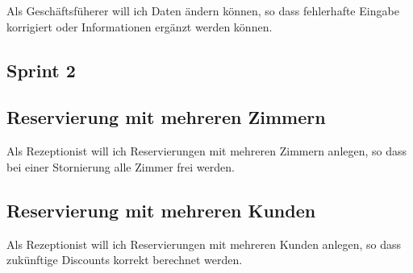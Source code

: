 \documentclass[11pt]{scrartcl}
\begin{document}
Als Geschäftsfüherer will ich Daten ändern können, so dass fehlerhafte Eingabe korrigiert oder Informationen ergänzt werden können.

\subsection{Sprint 2}

\subsection{Reservierung mit mehreren Zimmern}

Als Rezeptionist will ich Reservierungen mit mehreren Zimmern anlegen, so dass bei einer Stornierung alle Zimmer frei werden.

\subsection{Reservierung mit mehreren Kunden}

Als Rezeptionist will ich Reservierungen mit mehreren Kunden anlegen, so dass zukünftige Discounts korrekt berechnet werden.
\end{document}
